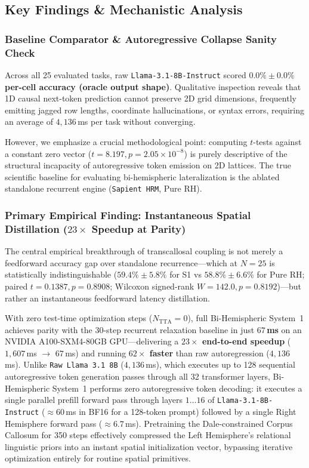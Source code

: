 \documentclass[11pt,a4paper]{article}
\theoremstyle{plain}
\theoremstyle{definition}
\theoremstyle{remark}
\begin{document}
\subsection{Key Findings \& Mechanistic Analysis}

\subsubsection{Baseline Comparator \& Autoregressive Collapse Sanity Check}

Across all 25 evaluated tasks, raw \texttt{Llama-3.1-8B-Instruct} scored \textbf{$0.0\% \pm 0.0\%$ per-cell accuracy (oracle output shape)}. Qualitative inspection reveals that 1D causal next-token prediction cannot preserve 2D grid dimensions, frequently emitting jagged row lengths, coordinate hallucinations, or syntax errors, requiring an average of $4{,}136$\,ms per task without converging. 

However, we emphasize a crucial methodological point: computing $t$-tests against a constant zero vector ($t = 8.197, p = 2.05 \times 10^{-8}$) is purely descriptive of the structural incapacity of autoregressive token emission on 2D lattices. The true scientific baseline for evaluating bi-hemispheric lateralization is the ablated standalone recurrent engine (\texttt{Sapient HRM}, Pure RH).

\subsubsection{Primary Empirical Finding: Instantaneous Spatial Distillation ($23\times$ Speedup at Parity)}

The central empirical breakthrough of transcallosal coupling is not merely a feedforward accuracy gap over standalone recurrence---which at $N=25$ is statistically indistinguishable ($59.4\% \pm 5.8\%$ for S1 vs $58.8\% \pm 6.6\%$ for Pure RH; paired $t = 0.1387, p = 0.8908$; Wilcoxon signed-rank $W = 142.0, p = 0.8192$)---but rather an instantaneous feedforward latency distillation.

With zero test-time optimization steps ($N_{\mathrm{TTA}} = 0$), full Bi-Hemispheric System~1 achieves parity with the 30-step recurrent relaxation baseline in just \textbf{$67$\,ms} on an NVIDIA A100-SXM4-80GB GPU---delivering a \textbf{$23\times$ end-to-end speedup} ($1{,}607$\,ms $\to$ $67$\,ms) and running \textbf{$62\times$ faster} than raw autoregression ($4{,}136$\,ms). Unlike \texttt{Raw Llama 3.1 8B} ($4{,}136$\,ms), which executes up to 128 sequential autoregressive token generation passes through all 32 transformer layers, Bi-Hemispheric System~1 performs zero autoregressive token decoding: it executes a single parallel prefill forward pass through layers $1\dots 16$ of \texttt{Llama-3.1-8B-Instruct} ($\approx 60$\,ms in BF16 for a 128-token prompt) followed by a single Right Hemisphere forward pass ($\approx 6.7$\,ms). Pretraining the Dale-constrained Corpus Callosum for 350 steps effectively compressed the Left Hemisphere's relational linguistic priors into an instant spatial initialization vector, bypassing iterative optimization entirely for routine spatial primitives.
\end{document}
